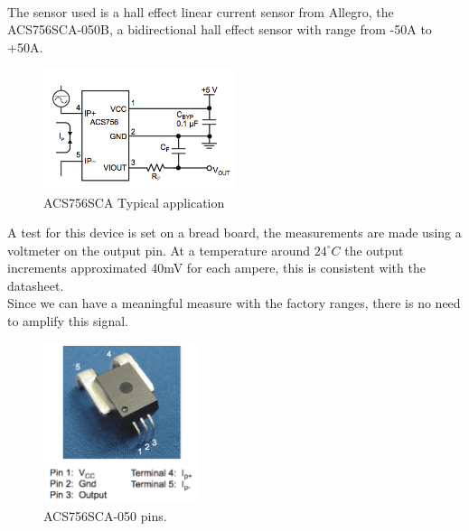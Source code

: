 \\%
The sensor used is a hall effect linear current sensor from Allegro, the ACS756SCA-050B, a bidirectional hall effect sensor with range from -50A to +50A.
%
\begin{figure}[H]
	\begin{centering}
		\includegraphics[width=0.5\textwidth]{images/current_sensor.png}
		\caption{ACS756SCA Typical application}
	\end{centering}
\end{figure}
%
A test for this device is set on a bread board, the measurements are made using a voltmeter on the output pin. At a temperature around $ 24^\circ C $ the output increments approximated 40mV for each ampere, this is consistent with the datasheet. \\
Since we can have a meaningful measure with the factory ranges, there is no need to amplify this signal.
%
\begin{figure}[H]
	\begin{centering}
		\includegraphics[width=0.40\textwidth]{images/tb5_CS_photo.png}
		\caption{ACS756SCA-050 pins.}
	\end{centering}
\end{figure}
%
